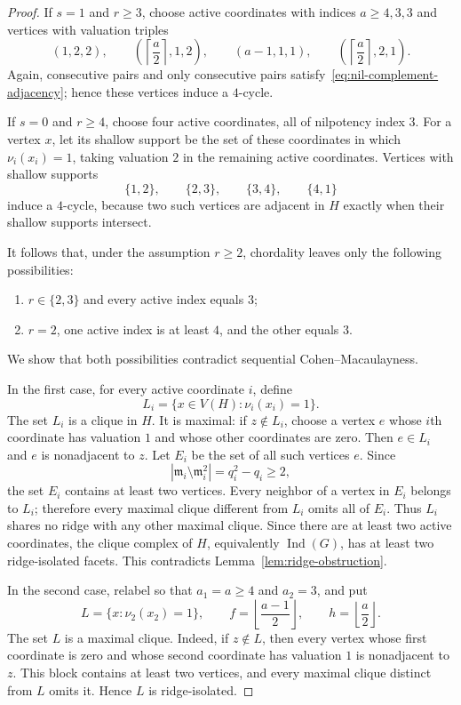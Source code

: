 \documentclass[10pt,a4paper]{amsart}
\begin{document}
\begin{proof}
If $s=1$ and $r\ge3$, choose active coordinates with indices $a\ge4,3,3$ and vertices with valuation triples
\[
(1,2,2),\qquad
\left(\left\lceil\frac a2\right\rceil,1,2\right),\qquad
(a-1,1,1),\qquad
\left(\left\lceil\frac a2\right\rceil,2,1\right).
\]
Again, consecutive pairs and only consecutive pairs satisfy~\eqref{eq:nil-complement-adjacency}; hence these vertices induce a $4$-cycle.

If $s=0$ and $r\ge4$, choose four active coordinates, all of nilpotency index $3$.  For a vertex $x$, let its shallow support be the set of these coordinates in which $\nu_i(x_i)=1$, taking valuation $2$ in the remaining active coordinates.  Vertices with shallow supports
\[
\{1,2\},\qquad \{2,3\},\qquad \{3,4\},\qquad \{4,1\}
\]
induce a $4$-cycle, because two such vertices are adjacent in $H$ exactly when their shallow supports intersect.

It follows that, under the assumption $r\ge2$, chordality leaves only the following possibilities:
\begin{enumerate}
\item $r\in\{2,3\}$ and every active index equals $3$;
\item $r=2$, one active index is at least $4$, and the other equals $3$.
\end{enumerate}
We show that both possibilities contradict sequential Cohen--Macaulayness.

In the first case, for every active coordinate $i$, define
\[
L_i=\{x\in V(H):\nu_i(x_i)=1\}.
\]
The set $L_i$ is a clique in $H$.  It is maximal: if $z\notin L_i$, choose a vertex $e$ whose $i$th coordinate has valuation $1$ and whose other coordinates are zero.  Then $e\in L_i$ and $e$ is nonadjacent to $z$.  Let $E_i$ be the set of all such vertices $e$.  Since
\[
|\mathfrak m_i\setminus\mathfrak m_i^2|=q_i^2-q_i\ge2,
\]
the set $E_i$ contains at least two vertices.  Every neighbor of a vertex in $E_i$ belongs to $L_i$; therefore every maximal clique different from $L_i$ omits all of $E_i$.  Thus $L_i$ shares no ridge with any other maximal clique.  Since there are at least two active coordinates, the clique complex of $H$, equivalently $\operatorname{Ind}(G)$, has at least two ridge-isolated facets.  This contradicts Lemma~\ref{lem:ridge-obstruction}.

In the second case, relabel so that $a_1=a\ge4$ and $a_2=3$, and put
\[
L=\{x:\nu_2(x_2)=1\},
\qquad
f=\left\lfloor\frac{a-1}{2}\right\rfloor,
\qquad
h=\left\lfloor\frac a2\right\rfloor.
\]
The set $L$ is a maximal clique.  Indeed, if $z\notin L$, then every vertex whose first coordinate is zero and whose second coordinate has valuation $1$ is nonadjacent to $z$.  This block contains at least two vertices, and every maximal clique distinct from $L$ omits it.  Hence $L$ is ridge-isolated.


\end{proof}
\end{document}
